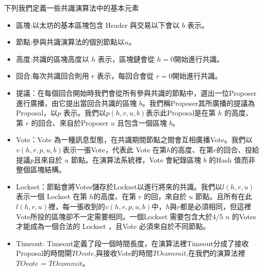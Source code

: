 %
下列我們定義一些共識演算法中的基本元素 
\begin{itemize}%
\item  區塊:以太坊的基本區塊包含 Header 與交易以下會以 $b$ 表示。
\item  節點:參與共識演算法的個別節點以$u$。
\item  高度:共識的區塊高度以 $h$ 表示，區塊鏈會從 $h=0$開始進行共識。
\item  回合:每次共識回合則用 $r$ 表示，每回合會從 $r=0$開始進行共識。
\item  提議：在每個回合開始時我們會從所有參與共識的節點中，選出一位Proposer進行廣播，由它提出當回合共識的區塊 $b$。我們稱Proposer其所廣播的提議為Proposal，以$p$ 表示。我們以$p(h,r,u,b)$表示此Proposal是在第 $h$ 的高度、第 $r$ 的回合、來自於Proposer $u$ 且包含一個區塊 $b$。
\item  Vote：Vote 為一種訊息型態，在共識期間節點之間會互相廣播Vote。我們以 $v(h,r,p,u,b)$表示一張Vote，代表此 Vote 在第$h$的高度、在第$r$的回合、投給提議$p$且來自於 $u$ 節點。在演算法系統裡，Vote 會紀錄區塊 $b$ 的Hash 值而非整個區塊結構。

\item  Lockset：節點會將Votes儲存於Lockset以進行將來的共識。我們以$l(h,r,u)$ 表示一個 Lockset 在第 $h$的高度、在第 $r$ 的回，來自於 $u$ 節點。且所有在此 $l(h,r,u)$裡，每一張收到的$v(h,r,p,u,b)$中，$h$與$r$都是必須相同，但這裡Vote所投的區塊卻不一定需要相同。一個Lockset 需要包含大於4/5 $n$ 的Votes才能成為一個合法的 Lockset ，且Vote 必須來自於不同節點。
\item Timeout: Timeout定義了段一個時間長度，在演算法裡Timeout分成了接收Proposal的時間閘$TOvote$,與接收Vote的時間$TOcommit$,在我們的演算法裡$TOvote$ = $TOcommit$。 

\end{itemize}